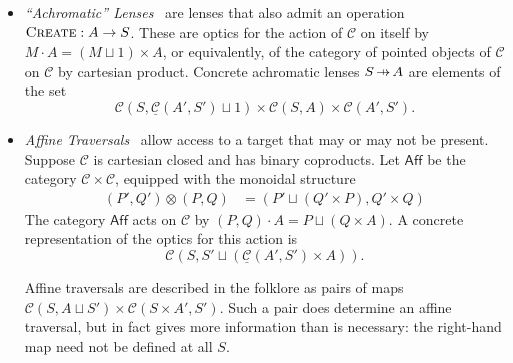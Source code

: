 \documentclass[11pt,letterpaper]{article}
\theoremstyle{plain}
\theoremstyle{definition}
\newcommand{\C}{\mathscr{C}}
\newcommand{\homC}{\underline{\C}}
\newcommand{\Optic}{\mathbf{Optic}}
\newcommand{\fcreate}{\textsc{Create}}
\newcommand{\hto}{\ensuremath{\,\mathaccent\shortmid\rightarrow\,}}
\begin{document}
\begin{itemize}
\item \emph{``Achromatic'' Lenses}~\cite[Section 5.2]{ProfunctorOpticsThesis} are lenses that also admit an operation $\fcreate : A \to S$. These are optics for the action of $\C$ on itself by $M \cdot A = (M \sqcup 1) \times A$, or equivalently, of the category of pointed objects of $\C$ on $\C$ by cartesian product. Concrete achromatic lenses $S \hto A$ are elements of the set \[\C(S, \homC(A', S') \sqcup 1) \times \C(S, A) \times \C(A', S').\]
\item \emph{Affine Traversals}~\cite{AffineTraversalPost} allow access to a target that may or may not be present. Suppose $\C$ is cartesian closed and has binary coproducts. Let $\mathsf{Aff}$ be the category $\C \times \C$, equipped with the monoidal structure
\begin{align*}
  (P', Q') \otimes (P, Q) &= (P' \sqcup (Q' \times P) , Q' \times Q)
\end{align*}
The category $\mathsf{Aff}$ acts on $\C$ by $(P, Q) \cdot A = P \sqcup (Q \times A)$. A concrete representation of the optics for this action is \[\C(S, S' \sqcup (\homC(A', S') \times A)).\]

Affine traversals are described in the folklore as pairs of maps $\C(S, A \sqcup S') \times \C(S\times A', S')$. Such a pair does determine an affine traversal, but in fact gives more information than is necessary: the right-hand map need not be defined at all $S$.


\end{itemize}
\end{document}

